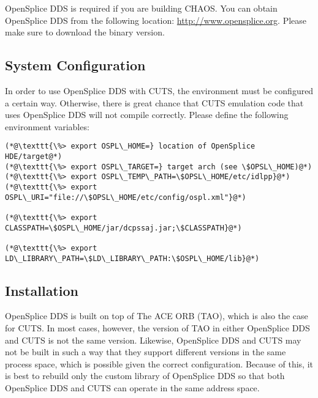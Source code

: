 OpenSplice DDS is required if you are building CHAOS. You can obtain 
OpenSplice DDS from the following location: \url{http://www.opensplice.org}.
Please make sure to download the binary version.

\subsection{System Configuration}

In order to use OpenSplice DDS with CUTS, the environment must be configured 
a certain way. Otherwise, there is great chance that CUTS emulation 
code that uses OpenSplice DDS will not compile correctly. Please define the 
following environment variables:
\begin{lstlisting}
(*@\texttt{\%> export OSPL\_HOME=} location of OpenSplice HDE/target@*)
(*@\texttt{\%> export OSPL\_TARGET=} target arch (see \$OPSL\_HOME)@*)
(*@\texttt{\%> export OSPL\_TEMP\_PATH=\$OPSL\_HOME/etc/idlpp}@*)
(*@\texttt{\%> export OSPL\_URI="file://\$OPSL\_HOME/etc/config/ospl.xml"}@*)

(*@\texttt{\%> export CLASSPATH=\$OSPL\_HOME/jar/dcpssaj.jar;\$CLASSPATH}@*)

(*@\texttt{\%> export LD\_LIBRARY\_PATH=\$LD\_LIBRARY\_PATH:\$OSPL\_HOME/lib}@*)
\end{lstlisting}

\subsection{Installation}

OpenSplice DDS is built on top of The ACE ORB (TAO), which is also the
case for CUTS. In most cases, however, the version of TAO in either 
OpenSplice DDS and CUTS is not the same version. Likewise, OpenSplice DDS
and CUTS may not be built in such a way that they support different 
versions in the same process space, which is possible given the correct
configuration. Because of this, it is best to rebuild only the custom
library of OpenSplice DDS so that both OpenSplice DDS and CUTS can operate 
in the same address space. 

